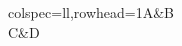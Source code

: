 \documentclass{article}\usepackage[margin=20mm]{geometry}
\begin{document}
{\gradtblrtagging{}\begin{longtblr}{colspec={ll},rowhead=1}A&B\\C&D\\\end{longtblr}}
\end{document}
